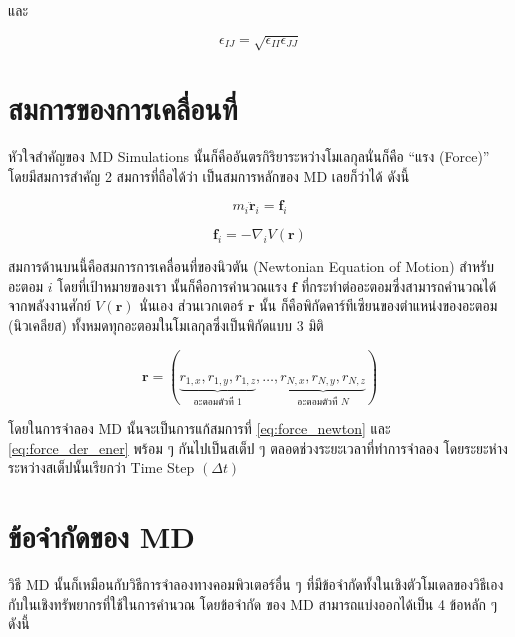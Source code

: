 \noindent และ

\begin{equation}
  \epsilon_{IJ}
  =
  \sqrt{\epsilon_{II} \epsilon_{JJ}}
\end{equation}

\section{สมการของการเคลื่อนที่}

หัวใจสำคัญของ MD Simulations นั้นก็คืออันตรกิริยาระหว่างโมเลกุลนั่นก็คือ \enquote{แรง (Force)} โดยมีสมการสำคัญ 2 สมการที่ถือได้ว่า%
เป็นสมการหลักของ MD เลยก็ว่าได้ ดังนี้

\begin{equation}
  \label{eq:force_newton}
  m_{i}\bm{\ddot{r}}_{i} = \bm{f}_{i}
\end{equation}

\begin{equation}
  \label{eq:force_der_ener}
  \bm{f}_{i} = -\nabla_{i}V(\bm{r})
\end{equation}

\noindent สมการด้านบนนี้คือสมการการเคลื่อนที่ของนิวตัน (Newtonian Equation of Motion) สำหรับอะตอม $i$ โดยที่เป้าหมายของเรา%
นั้นก็คือการคำนวณแรง $\bm{f}$ ที่กระทำต่ออะตอมซึ่งสามารถคำนวณได้จากพลังงานศักย์ $V(\bm{r})$ นั่นเอง ส่วนเวกเตอร์ $\bm{r}$ นั้น%
ก็คือพิกัดคาร์ทีเซียนของตำแหน่งของอะตอม (นิวเคลียส) ทั้งหมดทุกอะตอมในโมเลกุลซึ่งเป็นพิกัดแบบ 3 มิติ

\begin{equation}
  \bm{r} = (\underbrace{r_{1,x}, r_{1,y}, r_{1,z}}_{\text{อะตอมตัวที่ 1}}, \dots,
  \underbrace{r_{N,x}, r_{N,y}, r_{N,z}}_{\text{อะตอมตัวที่ $N$}})
\end{equation}

โดยในการจำลอง MD นั้นจะเป็นการแก้สมการที่ \eqref{eq:force_newton} และ \eqref{eq:force_der_ener} พร้อม ๆ กันไปเป็นสเต็ป ๆ
ตลอดช่วงระยะเวลาที่ทำการจำลอง โดยระยะห่างระหว่างสเต็ปนั้นเรียกว่า Time Step $(\Delta t)$

\section{ข้อจำกัดของ MD}

วิธี MD นั้นก็เหมือนกับวิธีการจำลองทางคอมพิวเตอร์อื่น ๆ ที่มีข้อจำกัดทั้งในเชิงตัวโมเดลของวิธีเองกับในเชิงทรัพยากรที่ใช้ในการคำนวณ โดยข้อจำกัด%
ของ MD สามารถแบ่งออกได้เป็น 4 ข้อหลัก ๆ ดังนี้

